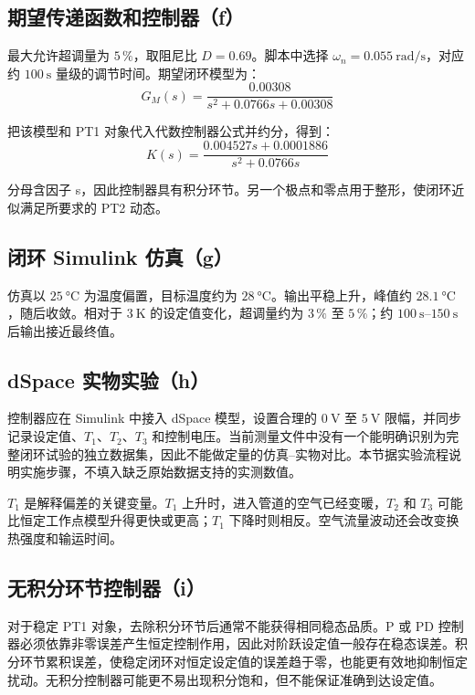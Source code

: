 \subsection{期望传递函数和控制器（f）}

最大允许超调量为 $5\,\%$，取阻尼比 $D = 0.69$。脚本中选择 $\omega_n = \SI{0.055}{\radian\per\second}$，对应约 $\SI{100}{\second}$ 量级的调节时间。期望闭环模型为：
\begin{equation}
  G_M(s) = \frac{0.00308}{s^2 + 0.0766s + 0.00308}
\end{equation}

把该模型和 PT1 对象代入代数控制器公式并约分，得到：
\begin{equation}
  K(s) = \frac{0.004527s + 0.0001886}{s^2 + 0.0766s}
\end{equation}

分母含因子 s，因此控制器具有积分环节。另一个极点和零点用于整形，使闭环近似满足所要求的 PT2 动态。

\subsection{闭环 Simulink 仿真（g）}

仿真以 $\SI{25}{\celsius}$ 为温度偏置，目标温度约为 $\SI{28}{\celsius}$。输出平稳上升，峰值约 $\SI{28.1}{\celsius}$，随后收敛。相对于 $\SI{3}{\kelvin}$ 的设定值变化，超调量约为 $3\,\%$ 至 $5\,\%$；约 $\SIrange{100}{150}{\second}$ 后输出接近最终值。

\subsection{dSpace 实物实验（h）}

控制器应在 Simulink 中接入 dSpace 模型，设置合理的 $\SI{0}{\volt}$ 至 $\SI{5}{\volt}$ 限幅，并同步记录设定值、$T_1$、$T_2$、$T_3$ 和控制电压。当前测量文件中没有一个能明确识别为完整闭环试验的独立数据集，因此不能做定量的仿真--实物对比。本节据实验流程说明实施步骤，不填入缺乏原始数据支持的实测数值。

$T_1$ 是解释偏差的关键变量。$T_1$ 上升时，进入管道的空气已经变暖，$T_2$ 和 $T_3$ 可能比恒定工作点模型升得更快或更高；$T_1$ 下降时则相反。空气流量波动还会改变换热强度和输运时间。

\subsection{无积分环节控制器（i）}

对于稳定 PT1 对象，去除积分环节后通常不能获得相同稳态品质。P 或 PD 控制器必须依靠非零误差产生恒定控制作用，因此对阶跃设定值一般存在稳态误差。积分环节累积误差，使稳定闭环对恒定设定值的误差趋于零，也能更有效地抑制恒定扰动。无积分控制器可能更不易出现积分饱和，但不能保证准确到达设定值。
